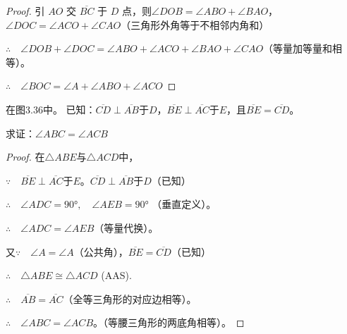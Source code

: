 \begin{proof}
引 $AO$ 交 $\overline{BC}$ 于 $D$ 点，则$\angle DOB=\angle ABO+\angle BAO$，$\angle DOC=\angle ACO+\angle CAO$（三角形外角等于不相邻内角和）

$\therefore\quad \angle DOB+\angle DOC=\angle ABO+\angle ACO+
\angle BAO+\angle CAO$（等量加等量和相等）。

$\therefore\quad \angle BOC=\angle A+\angle ABO+\angle ACO$
\end{proof}

\begin{figure}
    \begin{minipage}[t]{0.48\linewidth}
    \centering
\begin{tikzpicture}[>=latex, scale=1]
    \end{tikzpicture}
    \caption{}
    \end{minipage}
    \begin{minipage}[t]{0.48\linewidth}
    \centering
    \begin{tikzpicture}[>=latex, scale=1]
    \end{tikzpicture}
    \caption{}
    \end{minipage}
    \end{figure}


\begin{example}
    在图3.36中。
    已知：$\overline{CD}\perp\overline{AB}$于$D$，$\overline{BE}\perp\overline{AC}$于$E$，且$\overline{BE}=\overline{CD}$。

    求证：$\angle ABC=\angle ACB$
\end{example}

\begin{proof}
    在$\triangle ABE$与$\triangle ACD$中，

$\because\quad  \overline{BE}\perp\overline{AC}$于$E$。$\overline{CD}\perp\overline{AB}$于$D$（已知）

$\therefore\quad \angle ADC=\ang{90},\quad \angle AEB=\ang{90}$
（垂直定义）。

$\therefore\quad \angle ADC=\angle AEB$（等量代换）。

又$\because\quad \angle A=\angle A$（公共角），$\overline{BE}=\overline{CD}$（已知）

$\therefore\quad \triangle ABE\cong \triangle ACD$ (AAS).

$\therefore\quad \overline{AB}=\overline{AC}$（全等三角形的对应边相等）。

$\therefore\quad \angle ABC=\angle ACB$。（等腰三角形的两底角相等）。
\end{proof}

